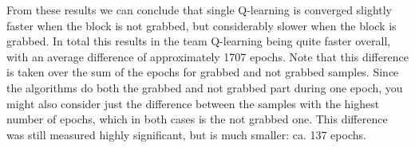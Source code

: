 From these results we can conclude that single Q-learning is converged slightly faster when the block is not grabbed, but considerably slower when the block is grabbed. In total this results in the team Q-learning being quite faster overall, with an average difference of approximately 1707 epochs. Note that this difference is taken over the sum of the epochs for grabbed and not grabbed samples. Since the algorithms do both the grabbed and not grabbed part during one epoch, you might also consider just the difference between the samples with the highest number of epochs, which in both cases is the not grabbed one. This difference was still measured highly significant, but is much smaller: ca. 137 epochs.